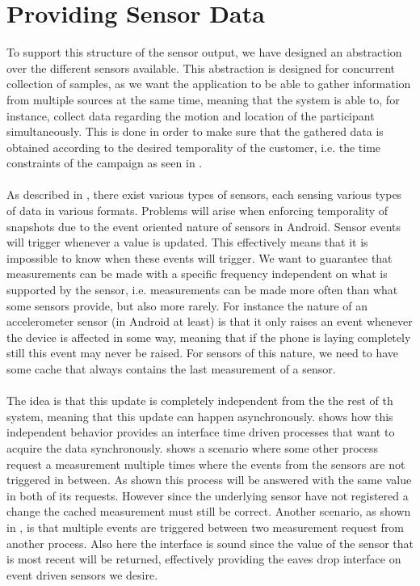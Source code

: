 
\section{Providing Sensor Data}
\label{sec:providing_sensor_data}

To support this structure of the sensor output, we have designed an abstraction over the different sensors available. This abstraction is designed for concurrent collection of samples, as we want the application to be able to gather information from multiple sources at the same time, meaning that the system is able to, for instance, collect data regarding the motion and location of the participant simultaneously. This is done in order to make sure that the gathered data is obtained according to the desired temporality of the customer, i.e. the time constraints of the campaign as seen in .
\\\\
As described in , there exist various types of sensors, each sensing various types of data in various formats. Problems will arise when enforcing temporality of snapshots due to the event oriented nature of sensors in Android. Sensor events will trigger whenever a value is updated. This effectively means that it is impossible to know when these events will trigger. We want to guarantee that measurements can be made with a specific frequency independent on what is supported by the sensor, i.e. measurements can be made more often than what some sensors provide, but also more rarely. For instance the nature of an accelerometer sensor (in Android at least) is that it only raises an event whenever the device is affected in some way, meaning that if the phone is laying completely still this event may never be raised. For sensors of this nature, we need to have some cache that always contains the last measurement of a sensor. 
\\\\
The idea is that this update is completely independent from the the rest of th system, meaning that this update can happen asynchronously.  shows how this independent behavior provides an interface time driven processes that want to acquire the data synchronously.  shows a scenario where some other process request a measurement multiple times where the events from the sensors are not triggered in between. As shown this process will be answered with the same value in both of its requests. However since the underlying sensor have not registered a change the cached measurement must still be correct. Another scenario, as shown in , is that multiple events are triggered between two measurement request from another process. Also here the interface is sound since the value of the sensor that is most recent will be returned, effectively providing the eaves drop interface on event driven sensors we desire.

